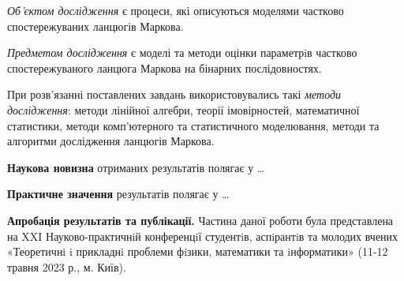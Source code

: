 \emph{Об'єктом дослідження} є процеси, які описуються моделями частково спостережуваних ланцюгів Маркова.

\emph{Предметом дослідження} є моделі та методи оцінки параметрiв частково спостережуваного ланцюга Маркова на бінарних послідовностях.

При розв’язанні поставлених завдань використовувались такі \emph{методи дослідження}: методи лінійної  алгебри, теорії імовірностей, математичної статистики, методи комп’ютерного та статистичного моделювання, методи та алгоритми дослідження ланцюгів Маркова.

\textbf{Наукова новизна} отриманих результатів полягає у \dots

\textbf{Практичне значення} результатів полягає у \dots

\textbf{Апробація результатів та публікації.} Частина даної роботи була представлена на XXI Науково-практичнiй конференцiї студентiв, аспiрантiв та молодих вчених «Теоретичнi i прикладнi проблеми фiзики, математики та iнформатики» (11-12 травня 2023 р., м. Київ).